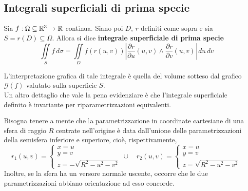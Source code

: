 \subsection{Integrali superficiali di prima specie}
 \begin{definition} \label{Def: Integrale superficiale di prima specie}
     Sia $f: \Omega \subseteq \mathbb{R}^3 \to \mathbb{R}$ continua. Siano poi $D,\ r$ definiti come sopra e sia $S=r(D) \subseteq \Omega$. Allora si dice \textbf{integrale superficiale di prima specie}
     \begin{equation*}
         \iint\limits_{S}{f}\, d\sigma = \iint\limits_{D}{f(r(u,v)) \left|\frac{\partial r}{\partial u} (u,v) \wedge \frac{\partial r}{\partial v}(u,v) \right|\, du\, dv}
     \end{equation*}
 \end{definition}
 L'interpretazione grafica di tale integrale è quella del volume sotteso dal grafico $\mathcal{G}(f)$ valutato sulla superficie $S$.\\
 Un altro dettaglio che vale la pena evidenziare è che l'integrale superficiale definito è invariante per riparametrizzazioni equivalenti.
 \begin{oss}
     Bisogna tenere a mente che la parametrizzazione in coordinate cartesiane di una sfera di raggio $R$ centrate nell'origine è data dall'unione delle parametrizzazioni della semisfera inferiore e superiore, cioè, rispettivamente,
     \begin{equation*}
         r_1(u,v)= \begin{cases}
             x= u\\
             y=v\\
             z=-\sqrt{R^2- u^2-v^2}
         \end{cases}
         \cup  \quad
         r_2(u,v)= \begin{cases}
             x=u\\
             y=v\\
             z=\sqrt{R^2- u^2-v^2}
         \end{cases}
     \end{equation*}
     Inoltre, se la sfera ha un versore normale uscente, occorre che le due parametrizzazioni abbiano orientazione ad esso concorde.
 \end{oss}
